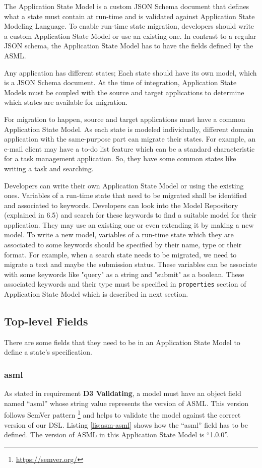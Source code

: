 
The Application State Model is a custom JSON Schema document that defines what a state must contain at run-time and is validated against Application State Modeling Language. To enable run-time state migration, developers should write a custom Application State Model or use an existing one. In contrast to a regular JSON schema, the Application State Model has to have the fields defined by the ASML.

Any application has different states; Each state should have its own model, which is a JSON Schema document. At the time of integration, Application State Models must be coupled with the source and target applications to determine which states are available for migration.

For migration to happen, source and target applications must have a common Application State Model. As each state is modeled individually, different domain application with the same-purpose part can migrate their states. For example, an e-mail client may have a to-do list feature which can be a standard characteristic for a task management application. So, they have some common states like writing a task and searching.

Developers can write their own Application State Model or using the existing ones. Variables of a run-time state that need to be migrated shall be identified and associated to keywords. Developers can look into the Model Repository (explained in 6.5) and search for these keywords to find a suitable model for their application. They may use an existing one or even extending it by making a new model. To write a new model, variables of a run-time state which they are associated to some keywords should be specified by their name, type or their format. For example, when a search state needs to be migrated, we need to migrate a text and maybe the submission status. These variables can be associate with some keywords like "query" as a string and "submit" as a boolean. These associated keywords and their type must be specified in \lstinline[basicstyle=\ttfamily]{properties} section of Application State Model which is described in next section. 

\subsection{Top-level Fields}
There are some fields that they need to be in an Application State Model to define a state’s specification.

\subsubsection{asml}
As stated in requirement \textbf{D3 Validating}, a model must have an object field named “asml” whose string value represents the version of ASML. This version follows SemVer pattern \footnote{\url{https://semver.org/}} and helps to validate the model against the correct version of our DSL. Listing \ref{lis:asm-asml} shows how the “asml” field has to be defined. The version of ASML in this Application State Model is “1.0.0”.

